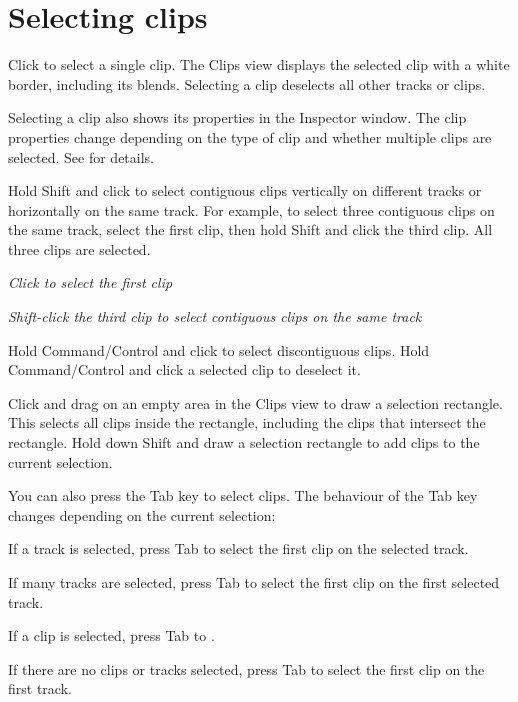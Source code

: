 \chapter{Selecting clips}
\hypertarget{md__library_2_package_cache_2com_8unity_8timeline_0d1_87_86_2_documentation_0i_2clp__select}{}\label{md__library_2_package_cache_2com_8unity_8timeline_0d1_87_86_2_documentation_0i_2clp__select}
\label{md__library_2_package_cache_2com_8unity_8timeline_0d1_87_86_2_documentation_0i_2clp__select_autotoc_md1125}%
%
 Click to select a single clip. The Clips view displays the selected clip with a white border, including its blends. Selecting a clip deselects all other tracks or clips.

Selecting a clip also shows its properties in the Inspector window. The clip properties change depending on the type of clip and whether multiple clips are selected. See  for details.

Hold Shift and click to select contiguous clips vertically on different tracks or horizontally on the same track. For example, to select three contiguous clips on the same track, select the first clip, then hold Shift and click the third clip. All three clips are selected.



{\itshape Click to select the first clip}



{\itshape Shift-\/click the third clip to select contiguous clips on the same track}

Hold Command/\+Control and click to select discontiguous clips. Hold Command/\+Control and click a selected clip to deselect it.

Click and drag on an empty area in the Clips view to draw a selection rectangle. This selects all clips inside the rectangle, including the clips that intersect the rectangle. Hold down Shift and draw a selection rectangle to add clips to the current selection.

You can also press the Tab key to select clips. The behaviour of the Tab key changes depending on the current selection\+:


\begin{DoxyItemize}
\item If a track is selected, press Tab to select the first clip on the selected track.
\item If many tracks are selected, press Tab to select the first clip on the first selected track.
\item If a clip is selected, press Tab to .
\item If there are no clips or tracks selected, press Tab to select the first clip on the first track.
\end{DoxyItemize}

